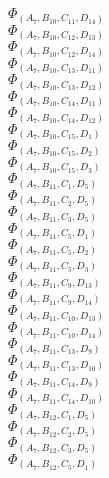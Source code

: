 \documentclass[14pt]{article}
\begin{document}
    $\Phi_{({A}_{7}, {B}_{10}, {C}_{11}, {D}_{14})}$ \\ 
    $\Phi_{({A}_{7}, {B}_{10}, {C}_{12}, {D}_{13})}$ \\ 
    $\Phi_{({A}_{7}, {B}_{10}, {C}_{12}, {D}_{14})}$ \\ 
    $\Phi_{({A}_{7}, {B}_{10}, {C}_{13}, {D}_{11})}$ \\ 
    $\Phi_{({A}_{7}, {B}_{10}, {C}_{13}, {D}_{12})}$ \\ 
    $\Phi_{({A}_{7}, {B}_{10}, {C}_{14}, {D}_{11})}$ \\ 
    $\Phi_{({A}_{7}, {B}_{10}, {C}_{14}, {D}_{12})}$ \\ 
    $\Phi_{({A}_{7}, {B}_{10}, {C}_{15}, {D}_{1})}$ \\ 
    $\Phi_{({A}_{7}, {B}_{10}, {C}_{15}, {D}_{2})}$ \\ 
    $\Phi_{({A}_{7}, {B}_{10}, {C}_{15}, {D}_{3})}$ \\ 
    $\Phi_{({A}_{7}, {B}_{11}, {C}_{1}, {D}_{5})}$ \\ 
    $\Phi_{({A}_{7}, {B}_{11}, {C}_{2}, {D}_{5})}$ \\ 
    $\Phi_{({A}_{7}, {B}_{11}, {C}_{3}, {D}_{5})}$ \\ 
    $\Phi_{({A}_{7}, {B}_{11}, {C}_{5}, {D}_{1})}$ \\ 
    $\Phi_{({A}_{7}, {B}_{11}, {C}_{5}, {D}_{2})}$ \\ 
    $\Phi_{({A}_{7}, {B}_{11}, {C}_{5}, {D}_{3})}$ \\ 
    $\Phi_{({A}_{7}, {B}_{11}, {C}_{9}, {D}_{13})}$ \\ 
    $\Phi_{({A}_{7}, {B}_{11}, {C}_{9}, {D}_{14})}$ \\ 
    $\Phi_{({A}_{7}, {B}_{11}, {C}_{10}, {D}_{13})}$ \\ 
    $\Phi_{({A}_{7}, {B}_{11}, {C}_{10}, {D}_{14})}$ \\ 
    $\Phi_{({A}_{7}, {B}_{11}, {C}_{13}, {D}_{9})}$ \\ 
    $\Phi_{({A}_{7}, {B}_{11}, {C}_{13}, {D}_{10})}$ \\ 
    $\Phi_{({A}_{7}, {B}_{11}, {C}_{14}, {D}_{9})}$ \\ 
    $\Phi_{({A}_{7}, {B}_{11}, {C}_{14}, {D}_{10})}$ \\ 
    $\Phi_{({A}_{7}, {B}_{12}, {C}_{1}, {D}_{5})}$ \\ 
    $\Phi_{({A}_{7}, {B}_{12}, {C}_{2}, {D}_{5})}$ \\ 
    $\Phi_{({A}_{7}, {B}_{12}, {C}_{3}, {D}_{5})}$ \\ 
    $\Phi_{({A}_{7}, {B}_{12}, {C}_{5}, {D}_{1})}$ \\ 
\end{document}
